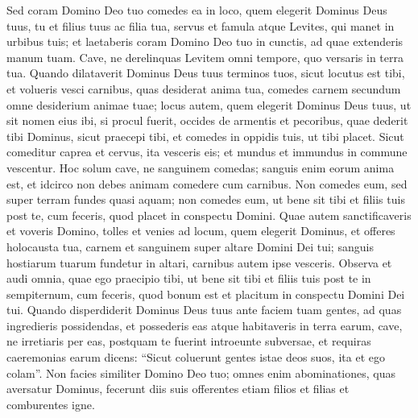 \begin{biblechapter}
\verse Sed coram Domino Deo tuo comedes ea in loco, quem elegerit Dominus Deus tuus, tu et filius tuus ac filia tua, servus et famula atque Levites, qui manet in urbibus tuis; et laetaberis coram Domino Deo tuo in cunctis, ad quae extenderis manum tuam.  
\verse Cave, ne derelinquas Levitem omni tempore, quo versaris in terra tua. 
\verse Quando dilataverit Dominus Deus tuus terminos tuos, sicut locutus est tibi, et volueris vesci carnibus, quas desiderat anima tua, comedes carnem secundum omne desiderium animae tuae; 
\verse locus autem, quem elegerit Dominus Deus tuus, ut sit nomen eius ibi, si procul fuerit, occides de armentis et pecoribus, quae dederit tibi Dominus, sicut praecepi tibi, et comedes in oppidis tuis, ut tibi placet. 
\verse Sicut comeditur caprea et cervus, ita vesceris eis; et mundus et immundus in commune vescentur. 
\verse Hoc solum cave, ne sanguinem comedas; sanguis enim eorum anima est, et idcirco non debes animam comedere cum carnibus. 
\verse Non comedes eum, sed super terram fundes quasi aquam; 
\verse non comedes eum, ut bene sit tibi et filiis tuis post te, cum feceris, quod placet in conspectu Domini. 
\verse Quae autem sanctificaveris et voveris Domino, tolles et venies ad locum, quem elegerit Dominus, 
\verse et offeres holocausta tua, carnem et sanguinem super altare Domini Dei tui; sanguis hostiarum tuarum fundetur in altari, carnibus autem ipse vesceris. 
\verse Observa et audi omnia, quae ego praecipio tibi, ut bene sit tibi et filiis tuis post te in sempiternum, cum feceris, quod bonum est et placitum in conspectu Domini Dei tui. 
\verse Quando disperdiderit Dominus Deus tuus ante faciem tuam gentes, ad quas ingredieris possidendas, et possederis eas atque habitaveris in terra earum,  
\verse cave, ne irretiaris per eas, postquam te fuerint introeunte subversae, et requiras caeremonias earum dicens: “Sicut coluerunt gentes istae deos suos, ita et ego colam”. 
\verse Non facies similiter Domino Deo tuo; omnes enim abominationes, quas aversatur Dominus, fecerunt diis suis offerentes etiam filios et filias et comburentes igne. 
\end{biblechapter}

